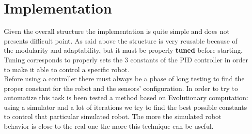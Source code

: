 \documentclass{llncs}
\newcommand{\labelsec}[1]{\label{sec:#1}}
\begin{document}
\newpage
\section{Implementation}
\labelsec{Implementation}
Given the overall structure the implementation is quite simple and does not presents difficult point.  
As said above the structure is very reusable because of the modularity and adaptability, but it must be properly \textbf{tuned} before starting. Tuning corresponds to properly sets the 3 constants of the PID controller in order to make it able to control a specific robot.\\

\noindent Before using a controller there must always be a phase of long testing to find the proper constant for the robot and the sensors' configuration. In order to try to automatize this task is been tested a method based on Evolutionary computation: using a simulator and a lot of iterations we try to find the best possible constants to control that particular simulated robot. The more the simulated robot behavior is close to the real one the more this technique can be useful. \\

\begin{center}
\end{center}
\end{document}
